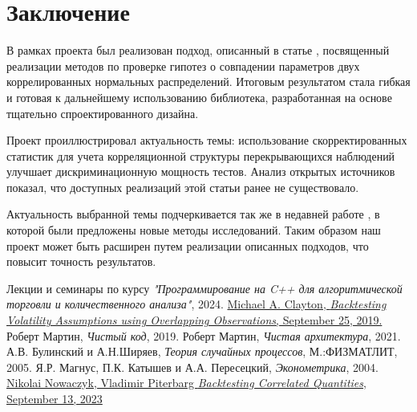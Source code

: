 \documentclass{article}
\begin{document}
\section{Заключение}

В рамках проекта был реализован подход, описанный в статье \cite{Cl2019}, 
посвященный реализации методов по проверке гипотез о совпадении параметров 
двух коррелированных нормальных распределений. Итоговым результатом стала 
гибкая и готовая к дальнейшему использованию библиотека, разработанная на 
основе тщательно спроектированного дизайна.

Проект проиллюстрировал актуальность темы: использование 
скорректированных статистик для учета корреляционной структуры 
перекрывающихся наблюдений улучшает дискриминационную мощность тестов. 
Анализ открытых источников показал, что доступных реализаций этой 
статьи ранее не существовало.

Актуальность выбранной темы подчеркивается так же в недавней работе 
\cite{Piterb2023}, в которой были предложены новые методы исследований. 
Таким образом наш проект может быть расширен путем реализации 
описанных подходов, что повысит точность результатов.

\begin{thebibliography}{99}
    Лекции и семинары по курсу \textit{"Программирование на C++ 
    для алгоритмической торговли и количественного анализа"}, 
    2024.
    \href{https://papers.ssrn.com/sol3/papers.cfm?abstract_id=3342541}
    {Michael A. Clayton, \textit{Backtesting Volatility Assumptions using 
    Overlapping Observations}, September 25, 2019.}
    Роберт Мартин, \textit{Чистый код}, 2019.
    Роберт Мартин, \textit{Чистая архитектура}, 2021.
    А.В. Булинский и А.Н.Ширяев, \textit{Теория случайных процессов}, 
    М.:ФИЗМАТЛИТ, 2005.
    Я.Р. Магнус, П.К. Катышев и А.А. Пересецкий, 
    \textit{Эконометрика}, 2004.
    \href{https://papers.ssrn.com/sol3/papers.cfm?abstract_id=4571812}
    {Nikolai Nowaczyk, Vladimir Piterbarg \textit{Backtesting Correlated 
    Quantities}, September 13, 2023} 
    \end{thebibliography}
\end{document}
